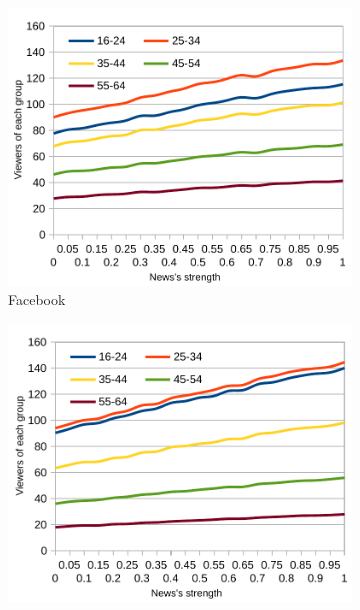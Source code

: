 \begin{figure}[!ht]
  \begin{subfigure}[l]{0.32\textwidth}
    \begin{center}
      \includegraphics[width=1\textwidth]{charts/second-test-fb_1.pdf}
    \end{center}
    \vspace*{-10pt}
    \caption{Facebook}
    \label{img:result_test_2_fb_1}
  \end{subfigure}  
  \begin{subfigure}[c]{0.32\textwidth}
    \begin{center}
      \includegraphics[width=1\textwidth]{charts/second-test-tw_1.pdf}

\end{center}
\end{subfigure}
\end{figure}
